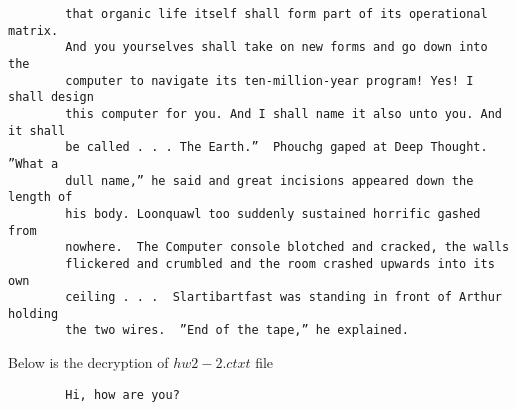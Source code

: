 \documentclass{article}
\begin{document}
\begin{verbatim}
        that organic life itself shall form part of its operational matrix.
        And you yourselves shall take on new forms and go down into the
        computer to navigate its ten-million-year program! Yes! I shall design
        this computer for you. And I shall name it also unto you. And it shall
        be called . . . The Earth.”  Phouchg gaped at Deep Thought.  ”What a
        dull name,” he said and great incisions appeared down the length of
        his body. Loonquawl too suddenly sustained horrific gashed from
        nowhere.  The Computer console blotched and cracked, the walls
        flickered and crumbled and the room crashed upwards into its own
        ceiling . . .  Slartibartfast was standing in front of Arthur holding
        the two wires.  ”End of the tape,” he explained.
    \end{verbatim}

    Below is the decryption of $hw2-2.ctxt$ file

    \begin{verbatim}
        Hi, how are you?
    \end{verbatim}
\end{document}
